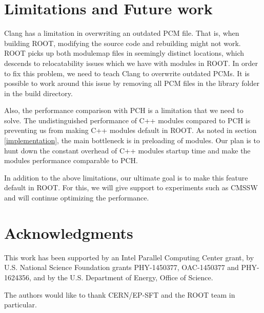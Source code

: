 \documentclass{webofc}
\begin{document}
\section{Limitations and Future work}
\label{limitationsandfuture}

Clang has a limitation in overwriting an outdated PCM file. That is, when building ROOT, modifying the source code and rebuilding might not work. ROOT picks up both modulemap files in seemingly distinct locations, which descends to relocatability issues which we have with modules in ROOT. In order to fix this problem, we need to teach Clang to overwrite outdated PCMs. It is possible to work around this issue by removing all PCM files in the library folder in the build directory.


Also, the performance comparison with PCH is a limitation that we need to solve. The undistinguished performance of C++ modules compared to PCH is preventing us from making C++ modules default in ROOT. As noted in section \ref{implementation}, the main bottleneck is in preloading of modules. Our plan is to hunt down the constant overhead of C++ modules startup time and make the modules performance comparable to PCH.


In addition to the above limitations, our ultimate goal is to make this feature default in ROOT. For this, we will give support to experiments such as CMSSW and will continue optimizing the performance.

\section{Acknowledgments}

This work has been supported by an Intel Parallel Computing Center grant, by U.S. National Science Foundation grants PHY-1450377, OAC-1450377 and PHY-1624356, and by the U.S. Department of Energy, Office of Science.

The authors would like to thank CERN/EP-SFT and the ROOT team in particular.
\end{document}
